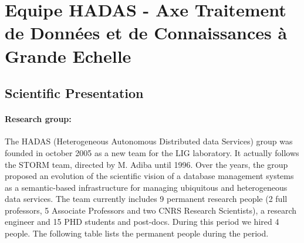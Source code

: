 

\section{Equipe HADAS - Axe Traitement de Donn{\'e}es et de Connaissances {\`a} Grande Echelle} 
\label{sec:hadas}

\subsection{Scientific Presentation} %
\label{sub:hadas_scientific_presentation}

\paragraph{Research group:}

The HADAS (Heterogeneous  Autonomous Distributed data Services) group was founded in october 2005 as a new team for the LIG laboratory. It actually follows the STORM team, directed by M. Adiba until 1996. 
Over the years, the group  proposed an evolution of the scientific vision of a database management systems  as  a semantic-based infrastructure for managing ubiquitous and heterogeneous data services. 
The team currently includes 9  permanent research people (2 full professors, 5 Associate Professors and two CNRS Research Scientists),  a research engineer and 15 PHD students and post-docs. During this period we hired 4 people. The following table lists the permanent people during the period. 


